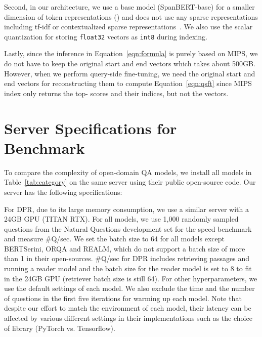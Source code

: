 \documentclass[11pt,a4paper]{article}
\newcommand\ttt[1]{\texttt{#1}}
\begin{document}
Second, in our architecture, we use a base model (SpanBERT-base) for a smaller dimension of token representations () and does not use any sparse representations including tf-idf or contextualized sparse representations~\citep{lee2020contextualized}.
We also use the scalar quantization for storing \ttt{float32} vectors as \ttt{int8} during indexing.

Lastly, since the inference in Equation~\eqref{eqn:formula} is purely based on MIPS, we do not have to keep the original start and end vectors which takes about 500GB.
However, when we perform query-side fine-tuning, we need the original start and end vectors for reconstructing them to compute Equation~\eqref{eqn:qsft} since MIPS index only returns the top- scores and their indices, but not the vectors.

\section{Server Specifications for Benchmark}\label{apdx:server}
To compare the complexity of open-domain QA models, we install all models in Table~\ref{tab:category} on the same server using their public open-source code.
Our server has the following specifications:

\begin{table}[h]
    \centering
    \caption{Server specification for the benchmark
    }
    \label{tab:server}
\end{table}
 For DPR, due to its large memory consumption, we use a similar server with a 24GB GPU (TITAN RTX).
For all models, we use 1,000 randomly sampled questions from the Natural Questions development set for the speed benchmark and measure \#Q/sec.
We set the batch size to 64 for all models except BERTSerini, ORQA and REALM, which do not support a batch size of more than 1 in their open-sources.
\#Q/sec for DPR includes retrieving passages and running a reader model and the batch size for the reader model is set to 8 to fit in the 24GB GPU (retriever batch size is still 64).
For other hyperparameters, we use the default settings of each model.
We also exclude the time and the number of questions in the first five iterations for warming up each model.
Note that despite our effort to match the environment of each model, their latency can be affected by various different settings in their implementations such as the choice of library (PyTorch vs. Tensorflow).
\end{document}

